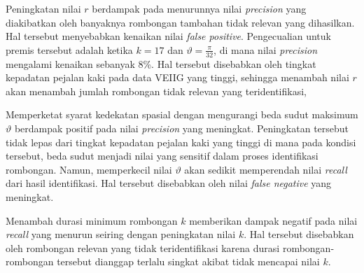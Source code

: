 Peningkatan nilai $r$ berdampak pada menurunnya nilai \textit{precision} yang diakibatkan oleh banyaknya rombongan tambahan tidak relevan yang dihasilkan. Hal tersebut menyebabkan kenaikan nilai \textit{false positive}. Pengecualian untuk premis tersebut adalah ketika $k = 17$ dan $\vartheta = \frac{\pi}{32}$, di mana nilai \textit{precision} mengalami kenaikan sebanyak 8\%. Hal tersebut disebabkan oleh tingkat kepadatan pejalan kaki pada data VEIIG yang tinggi, sehingga menambah nilai $r$ akan menambah jumlah rombongan tidak relevan yang teridentifikasi,

Memperketat syarat kedekatan spasial dengan mengurangi beda sudut maksimum $\vartheta$ berdampak positif pada nilai \textit{precision} yang meningkat. Peningkatan tersebut tidak lepas dari tingkat kepadatan pejalan kaki yang tinggi di mana pada kondisi tersebut, beda sudut menjadi nilai yang sensitif dalam proses identifikasi rombongan. Namun, memperkecil nilai $\vartheta$ akan sedikit memperendah nilai \textit{recall} dari hasil identifikasi. Hal tersebut disebabkan oleh nilai \textit{false negative} yang meningkat.

Menambah durasi minimum rombongan $k$ memberikan dampak negatif pada nilai \textit{recall} yang menurun seiring dengan peningkatan nilai $k$. Hal tersebut disebabkan oleh rombongan relevan yang tidak teridentifikasi karena durasi rombongan-rombongan tersebut dianggap terlalu singkat akibat tidak mencapai nilai $k$.  